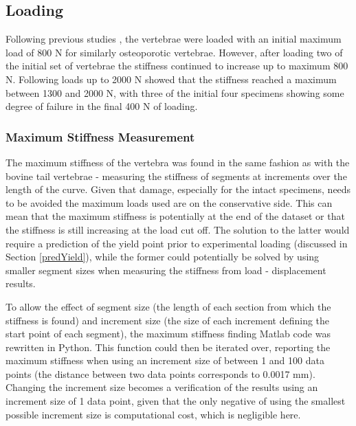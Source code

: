 \subsection{Loading}

Following previous studies \cite{Wijayathunga2008}, the vertebrae were loaded with an initial maximum load of 800 N for similarly osteoporotic vertebrae.
However, after loading two of the initial set of vertebrae the stiffness continued to increase up to maximum 800 N.
Following loads up to 2000 N showed that the stiffness reached a maximum between 1300 and 2000 N, with three of the initial four specimens showing some degree of failure in the final 400 N of loading.

\subsubsection{Maximum Stiffness Measurement}

The maximum stiffness of the vertebra was found in the same fashion as with the bovine tail vertebrae - measuring the stiffness of segments at increments over the length of the curve.
Given that damage, especially for the intact specimens, needs to be avoided the maximum loads used are on the conservative side.
This can mean that the maximum stiffness is potentially at the end of the dataset or that the stiffness is still increasing at the load cut off.
The solution to the latter would require a prediction of the yield point prior to experimental loading (discussed in Section \ref{predYield}), while the former could potentially be solved by using smaller segment sizes when measuring the stiffness from load - displacement results.

To allow the effect of segment size (the length of each section from which the stiffness is found) and increment size (the size of each increment defining the start point of each segment), the maximum stiffness finding Matlab code was rewritten in Python.
This function could then be iterated over, reporting the maximum stiffness when using an increment size of between 1 and 100 data points (the distance between two data points corresponds to 0.0017 mm).
Changing the increment size becomes a verification of the results using an increment size of 1 data point, given that the only negative of using the smallest possible increment size is computational cost, which is negligible here.

